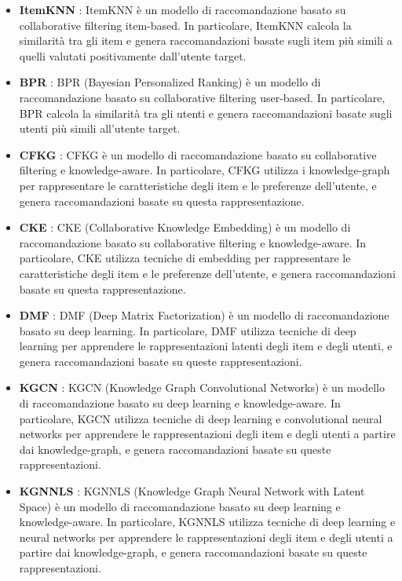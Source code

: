 \begin{itemize}
    \item \textbf{ItemKNN} \cite{ItemKNN}: ItemKNN è un modello di raccomandazione basato su collaborative filtering item-based. In particolare, ItemKNN calcola la similarità tra gli item e genera raccomandazioni basate sugli item più simili a quelli valutati positivamente dall'utente target.
    \item \textbf{BPR} \cite{BPR}: BPR (Bayesian Personalized Ranking) è un modello di raccomandazione basato su collaborative filtering user-based. In particolare, BPR calcola la similarità tra gli utenti e genera raccomandazioni basate sugli utenti più simili all'utente target.
    \item \textbf{CFKG} \cite{CFKG}: CFKG è un modello di raccomandazione basato su collaborative filtering e knowledge-aware. In particolare, CFKG utilizza i knowledge-graph per rappresentare le caratteristiche degli item e le preferenze dell'utente, e genera raccomandazioni basate su questa rappresentazione.
    \item \textbf{CKE} \cite{CKE}: CKE (Collaborative Knowledge Embedding) è un modello di raccomandazione basato su collaborative filtering e knowledge-aware. In particolare, CKE utilizza tecniche di embedding per rappresentare le caratteristiche degli item e le preferenze dell'utente, e genera raccomandazioni basate su questa rappresentazione.
    \item \textbf{DMF} \cite{DMF}: DMF (Deep Matrix Factorization) è un modello di raccomandazione basato su deep learning. In particolare, DMF utilizza tecniche di deep learning per apprendere le rappresentazioni latenti degli item e degli utenti, e genera raccomandazioni basate su queste rappresentazioni.
    \item \textbf{KGCN} \cite{KGCN}: KGCN (Knowledge Graph Convolutional Networks) è un modello di raccomandazione basato su deep learning e knowledge-aware. In particolare, KGCN utilizza tecniche di deep learning e convolutional neural networks per apprendere le rappresentazioni degli item e degli utenti a partire dai knowledge-graph, e genera raccomandazioni basate su queste rappresentazioni.
    \item \textbf{KGNNLS} \cite{KGNNLS}: KGNNLS (Knowledge Graph Neural Network with Latent Space) è un modello di raccomandazione basato su deep learning e knowledge-aware. In particolare, KGNNLS utilizza tecniche di deep learning e neural networks per apprendere le rappresentazioni degli item e degli utenti a partire dai knowledge-graph, e genera raccomandazioni basate su queste rappresentazioni.

\end{itemize}
